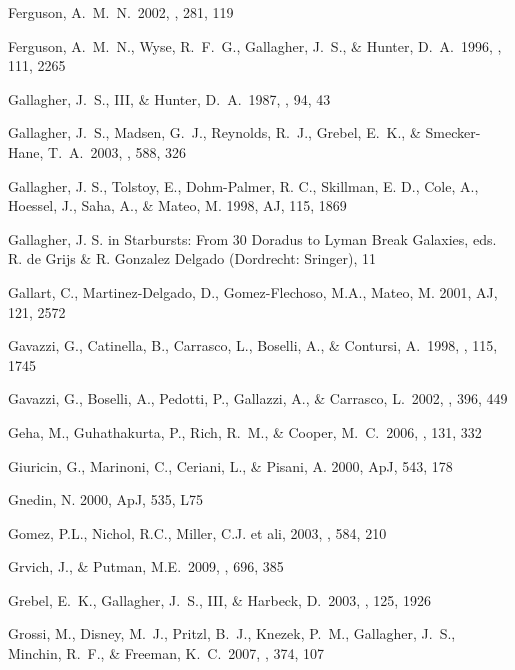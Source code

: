 \documentclass[12pt,onecolumn]{emulateapj}
\begin{document}
\begin{thebibliography}{}
Ferguson, A.~M.~N.\ 2002, \apss, 281, 119 

Ferguson, A.~M.~N., Wyse, R.~F.~G., Gallagher, J.~S., \& Hunter, D.~A.\ 
1996, \aj, 111, 2265 

Gallagher, J.~S., III, \& Hunter, D.~A.\ 1987, \aj, 94, 43 

Gallagher, J.~S., Madsen, G.~J., Reynolds, R.~J., Grebel, E.~K., \& 
    Smecker-Hane, T.~A.\ 2003, \apj, 588, 326 

Gallagher, J. S., Tolstoy, E., Dohm-Palmer, R. C., Skillman, E. D., Cole, A., 
Hoessel, J., Saha, A., \& Mateo, M. 1998, AJ, 115, 1869

Gallagher, J. S. in Starbursts: From 30 Doradus to Lyman Break Galaxies,
eds. R. de Grijs \& R. Gonzalez Delgado (Dordrecht: Sringer), 11

Gallart, C., Martinez-Delgado, D., Gomez-Flechoso, M.A., Mateo, M. 2001, AJ, 121, 2572

Gavazzi, G., Catinella, B., Carrasco, L., Boselli, A., \& Contursi, A.\ 
1998, \aj, 115, 1745 

Gavazzi, G., Boselli, A., Pedotti, P., Gallazzi, A., \& Carrasco, L.\ 
2002, \aap, 396, 449 

\bibitem[Geha et al.(2006)]{ggrc06} 
Geha, M., Guhathakurta, P., Rich, R.~M., \& Cooper, M.~C.\ 2006, \aj, 131, 332 

Giuricin, G., Marinoni, C., Ceriani, L., \& Pisani, A. 2000, ApJ, 543, 178

\bibitem[Gnedin (2000)]{g00}
Gnedin, N. 2000, ApJ, 535, L75

Gomez, P.L., Nichol, R.C., Miller, C.J. et ali, 2003, \apj, 584, 210

Grvich, J., \& Putman, M.E.\ 2009, \apj, 696, 385

\bibitem[Grebel et al.(2003)]{ggh03} 
Grebel, E.~K., Gallagher, J.~S., III, \& Harbeck, D.\ 2003, \aj, 125, 1926

\bibitem[Grossi et al.(2007)]{g07} 
Grossi, M., Disney, M.~J., Pritzl, B.~J., Knezek, P.~M., Gallagher, J.~S., 
    Minchin, R.~F., \& Freeman, K.~C.\ 2007, \mnras, 374, 107 


\end{thebibliography}
\end{document}
